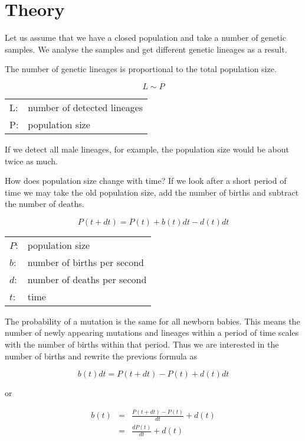 \section{Theory}

Let us assume that we have a closed population and take a
number of genetic samples. We analyse the samples and get
different genetic lineages as a result.

The number of genetic lineages is proportional to the 
total population size.

\begin{equation}
L \sim P \label{lineages-population}
\end{equation}

\begin{tabular}{ll}
L:   & number of detected lineages\\
P:   & population size
\end{tabular}
\vspace{1em}

If we detect all male lineages, for example, the population
size would be about twice as much.

How does population size change with time? If we look after a
short period of time we may take the old population size, add
the number of births and subtract the number of deaths.

\begin{equation}
P(t+dt) = P(t) + b(t)dt - d(t)dt 
\end{equation}

\begin{tabular}{ll}
$P$: & population size\\
$b$: & number of births per second\\
$d$: & number of deaths per second\\
$t$: &time
\end{tabular}
\vspace{1em}

The probability of a mutation is the same for all newborn
babies. This means the number of newly appearing mutations
and lineages within a period of time scales with the number
of births within that period. Thus we are interested in the
number of births and rewrite the previous formula as

\begin{equation}
b(t)dt = P(t+dt) - P(t) + d(t)dt
\end{equation}

or

\begin{eqnarray}
b(t) & = & \frac{P(t+dt)- P(t)}{dt} + d(t)\\
     & = & \frac{dP(t)}{dt} + d(t) \label{births-per-second}
\end{eqnarray}

